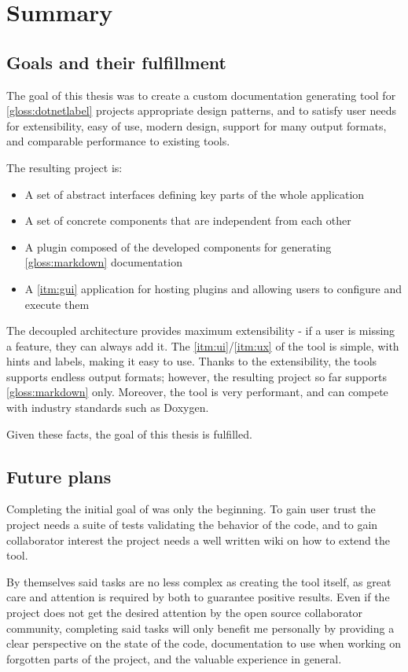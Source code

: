 \chapter*{Summary}

\section*{Goals and their fulfillment}

The goal of this thesis was to create a custom documentation generating tool for \ref{gloss:dotnetlabel} projects appropriate design patterns, and to satisfy user needs for extensibility, easy of use, modern design, support for many output formats, and comparable performance to existing tools.

The resulting project is:
\begin{itemize}
    \item A set of abstract interfaces defining key parts of the whole application
    \item A set of concrete components that are independent from each other
    \item A plugin composed of the developed components for generating \ref{gloss:markdown} documentation
    \item A \ref{itm:gui} application for hosting plugins and allowing users to configure and execute them
\end{itemize}

The decoupled architecture provides maximum extensibility - if a user is missing a feature, they can always add it. The \ref{itm:ui}/\ref{itm:ux} of the tool is simple, with hints and labels, making it easy to use. Thanks to the extensibility, the tools supports endless output formats; however, the resulting project so far supports \ref{gloss:markdown} only. Moreover, the tool is very performant, and can compete with industry standards such as Doxygen.

Given these facts, the goal of this thesis is fulfilled.

\section*{Future plans}

Completing the initial goal of was only the beginning. To gain user trust the project needs a suite of tests validating the behavior of the code, and to gain collaborator interest the project needs a well written wiki on how to extend the tool.

By themselves said tasks are no less complex as creating the tool itself, as great care and attention is required by both to guarantee positive results. Even if the project does not get the desired attention by the open source collaborator community, completing said tasks will only benefit me personally by providing a clear perspective on the state of the code, documentation to use when working on forgotten parts of the project, and the valuable experience in general.